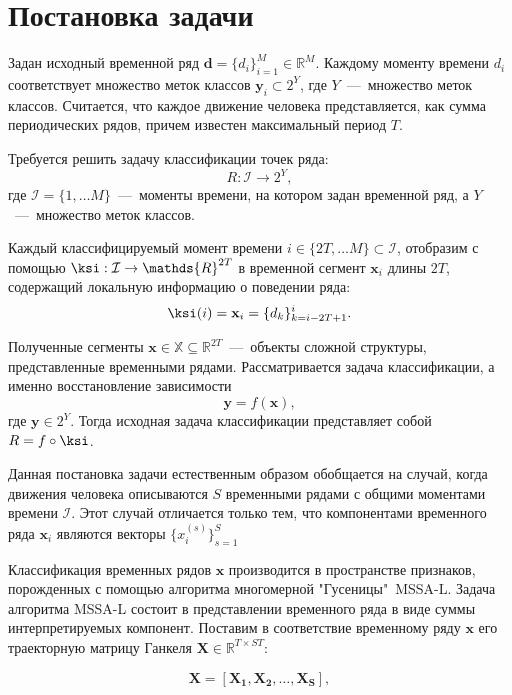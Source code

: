 \documentclass[12pt, twoside]{article}
\begin{document}
\section{Постановка задачи}

Задан исходный временной ряд $\mathbf{d}=\{d_i\}_{i=1}^M\in \mathds{R}^M$. Каждому моменту времени $d_i$ соответствует множество меток классов $\mathbf{y}_i\subset 2^Y$, где $Y$~---~множество меток классов. Считается, что каждое движение человека представляется, как сумма периодических рядов, причем известен максимальный период $T$.

Требуется решить задачу классификации точек ряда: $$R:\mathcal{I}\rightarrow 2^Y,$$ где $\mathcal{I}=\{1,\ldots M\}$~---~моменты времени, на котором задан временной ряд, а $Y$~---~множество меток классов.

Каждый классифицируемый момент времени $i\in \{2T,\ldots M\}\subset\mathcal{I}$, отобразим с помощью $\ksi:\mathcal{I}\rightarrow \mathds{R}^{2T}$ в временной сегмент $\mathbf{x}_i$ длины $2T$, содержащий локальную информацию о поведении ряда:
\begin{equation}\label{eq1}
\ksi(i) = \mathbf{x}_i = \{d_k\}_{k=i-2T+1}^{i}.
\end{equation}

Полученные сегменты $\mathbf{x} \in \mathbb{X}\subseteq \mathds{R}^{2T}$~---~объекты сложной структуры, представленные временными рядами. Рассматривается задача классификации, а именно восстановление зависимости $$\mathbf{y}=f(\mathbf{x}),$$ где $\mathbf{y}\in 2^Y$. Тогда исходная задача классификации представляет собой $R=f\circ \ksi$.

Данная постановка задачи естественным образом обобщается на случай, когда движения человека описываются $S$ временными рядами с общими моментами времени $\mathcal{I}$. Этот случай отличается только тем, что компонентами временного ряда $\mathbf{x}_i$ являются векторы $\{x_i^{(s)}\}_{s=1}^S$

Классификация временных рядов $\mathbf{x}$ производится в пространстве признаков, порожденных с помощью алгоритма многомерной "Гусеницы"\ MSSA-L. Задача алгоритма MSSA-L состоит в представлении временного ряда в виде суммы интерпретируемых компонент. Поставим в соответствие временному ряду $\mathbf{x}$ его траекторную матрицу Ганкеля $\mathbf{X}\in \mathds{R}^{T\times ST}$:

\begin{equation}\label{eq3}
\mathbf{X} = [\mathbf{X_1}, \mathbf{X_2},\ldots, \mathbf{X_S}],
\end{equation}
\end{document}
